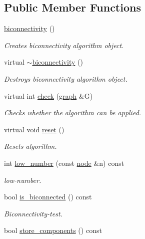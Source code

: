 \subsection*{Public Member Functions}
\begin{DoxyCompactItemize}
\item 
\mbox{\hyperlink{classbiconnectivity_aec8c11afda486322b872f468cabd1f56}{biconnectivity}} ()
\begin{DoxyCompactList}\small\item\em Creates biconnectivity algorithm object. \end{DoxyCompactList}\item 
virtual \mbox{\hyperlink{classbiconnectivity_af8e2bb061de4a08f95a2a3a94fdbd797}{$\sim$biconnectivity}} ()
\begin{DoxyCompactList}\small\item\em Destroys biconnectivity algorithm object. \end{DoxyCompactList}\item 
virtual int \mbox{\hyperlink{classbiconnectivity_a65e0e821f5e9ce8d210648d462fd2cfa}{check}} (\mbox{\hyperlink{classgraph}{graph}} \&G)
\begin{DoxyCompactList}\small\item\em Checks whether the algorithm can be applied. \end{DoxyCompactList}\item 
virtual void \mbox{\hyperlink{classbiconnectivity_a4393dd1e626887472f6967722349abc6}{reset}} ()
\begin{DoxyCompactList}\small\item\em Resets algorithm. \end{DoxyCompactList}\item 
int \mbox{\hyperlink{classbiconnectivity_ab61a092bfc7cf9e9b27210d339186327}{low\+\_\+number}} (const \mbox{\hyperlink{classnode}{node}} \&n) const
\begin{DoxyCompactList}\small\item\em low-\/number. \end{DoxyCompactList}\item 
bool \mbox{\hyperlink{classbiconnectivity_a50e7cee997b6d56ccbb9ae3fd039d9cd}{is\+\_\+biconnected}} () const
\begin{DoxyCompactList}\small\item\em Biconnectivity-\/test. \end{DoxyCompactList}\item 
bool \mbox{\hyperlink{classbiconnectivity_a1234e7a70f50fd60c855529fe6fa4acb}{store\+\_\+components}} () const

\end{DoxyCompactItemize}
